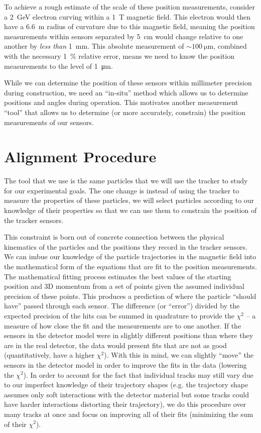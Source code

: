 To achieve a rough estimate of the scale of these position measurements, consider a
\qty{2}{\giga\electronvolt} electron curving within a \qty{1}{\tesla} magnetic field. This electron
would then have a \qty{6.6}{\meter} radius of curvature due to this magnetic field, meaning the
position measurements within sensors separated by \qty{5}{\centi\meter} would change relative to
one another by \emph{less than} \qty{1}{\milli\meter}. This absolute measurement of
$\sim\qty{100}{\micro\meter}$, combined with the necessary \qty{1}{\percent} relative error, means we
need to know the position measurements to the level of \qty{1}{\micro\meter}.

While we can determine the position of these sensors within millimeter precision during
construction, we need an ``in-situ'' method which allows us to determine positions
and angles during operation.
This motivates another measurement ``tool'' that allows us to determine (or more
accurately, constrain) the position measurements of our sensors.

\section{Alignment Procedure}
The tool that we use is the same particles that we will use the tracker to study for our
experimental goals. The one change is instead of using the tracker to measure the properties of
these particles, we will select particles according to our knowledge of their properties so that we
can use them to constrain the position of the tracker sensors.

This constraint is born out of concrete connection between the physical kinematics of the particles
and the positions they record in the tracker sensors.
We can imbue our knowledge of the particle trajectories in the magnetic field into the
mathematical form of the equations that are fit to the position measurements.
The mathematical fitting process estimates the best values of the starting position and 3D momentum
from a set of points given the assumed individual precision of these points.
This produces a prediction of where the particle ``should have'' passed through each sensor.
The difference (or ``error'') divided by the expected precision of the hits can be summed
in quadrature to provide the $\chi^2$ -- a measure of how close the fit and the measurements
are to one another.
If the sensors in the detector model were in slightly different
positions than where they are in the real detector, the data would present fits that are not as
good (quantitatively, have a higher $\chi^2$).
With this in mind, we can slightly ``move'' the sensors in the detector model in order to
improve the fits in the data (lowering the $\chi^2$).
In order to account for the fact that individual tracks may still vary due to our
imperfect knowledge of their trajectory shapes (e.g. the trajectory shape assumes only soft
interactions with the detector material but some tracks could have harder interactions distorting
their trajectory), we do this procedure over many tracks at once and focus on improving all of
their fits (minimizing the sum of their $\chi^2$).

